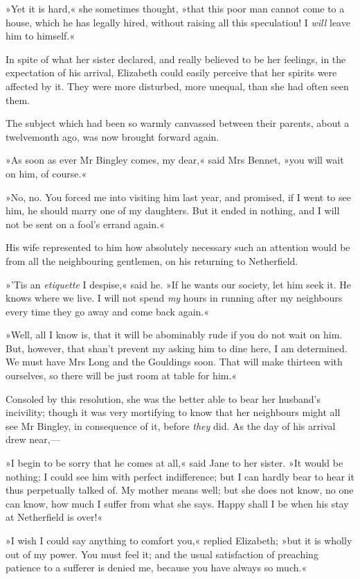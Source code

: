 »Yet it is hard,« she sometimes thought, »that this poor man cannot come to a house, which he has legally hired, without raising all this speculation! I \textit{will} leave him to himself.«

In spite of what her sister declared, and really believed to be her feelings, in the expectation of his arrival, Elizabeth could easily perceive that her spirits were affected by it. They were more disturbed, more unequal, than she had often seen them.

The subject which had been so warmly canvassed between their parents, about a twelvemonth ago, was now brought forward again.

»As soon as ever Mr Bingley comes, my dear,« said Mrs Bennet, »you will wait on him, of course.«

»No, no. You forced me into visiting him last year, and promised, if I went to see him, he should marry one of my daughters. But it ended in nothing, and I will not be sent on a fool's errand again.«

His wife represented to him how absolutely necessary such an attention would be from all the neighbouring gentlemen, on his returning to Netherfield.

»'Tis an \textit{etiquette} I despise,« said he. »If he wants our society, let him seek it. He knows where we live. I will not spend \textit{my} hours in running after my neighbours every time they go away and come back again.«

»Well, all I know is, that it will be abominably rude if you do not wait on him. But, however, that shan't prevent my asking him to dine here, I am determined. We must have Mrs Long and the Gouldings soon. That will make thirteen with ourselves, so there will be just room at table for him.«

Consoled by this resolution, she was the better able to bear her husband's incivility; though it was very mortifying to know that her neighbours might all see Mr Bingley, in consequence of it, before \textit{they} did. As the day of his arrival drew near,—

»I begin to be sorry that he comes at all,« said Jane to her sister. »It would be nothing; I could see him with perfect indifference; but I can hardly bear to hear it thus perpetually talked of. My mother means well; but she does not know, no one can know, how much I suffer from what she says. Happy shall I be when his stay at Netherfield is over!«

»I wish I could say anything to comfort you,« replied Elizabeth; »but it is wholly out of my power. You must feel it; and the usual satisfaction of preaching patience to a sufferer is denied me, because you have always so much.«

